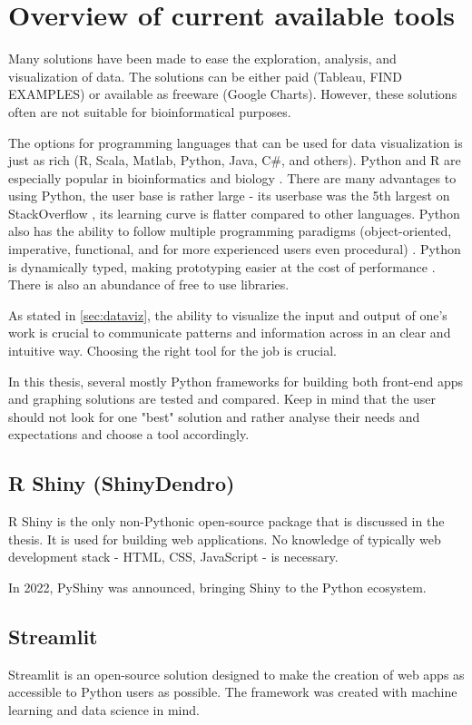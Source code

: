 \chapter{Overview of current available tools}
\label{chap:four}
Many solutions have been made to ease the exploration, analysis, and visualization of data. The solutions can be either paid (Tableau, FIND EXAMPLES) or available as freeware (Google Charts). However, these solutions often are not suitable for bioinformatical purposes. 

The options for programming languages that can be used for data visualization is just as rich (R, Scala, Matlab, Python, Java, C\#, and others). Python and R are especially popular in bioinformatics and biology \citep{giorgi2022r, gentleman2008r, bassi2016python}. There are many advantages to using Python, the user base is rather large - its userbase was the 5th largest on StackOverflow \citep{srinath2017python}, its learning curve is flatter compared to other languages. Python also has the ability to follow multiple programming paradigms (object-oriented, imperative, functional, and for more experienced users even procedural) \citep{srinath2017python, dyer2022exploratory}. Python is dynamically typed, making prototyping easier at the cost of performance \citep{tratt2009dynamically}. There is also an abundance of free to use libraries.

As stated in \ref{sec:dataviz}, the ability to visualize the input and output of one's work is crucial to communicate patterns and information across in an clear and intuitive way. Choosing the right tool for the job is crucial. 

In this thesis, several mostly Python frameworks for building both front-end apps and graphing solutions are tested and compared. Keep in mind that the user should not look for one "best" solution and rather analyse their needs and expectations and choose a tool accordingly. 

\section{R Shiny (ShinyDendro)}
\label{sec:streamlit}
R Shiny is the only non-Pythonic open-source package that is discussed in the thesis. It is used for building web applications. No knowledge of typically web development stack - HTML, CSS, JavaScript - is necessary. 

In 2022, PyShiny was announced, bringing Shiny to the Python ecosystem.

\section{Streamlit}
\label{sec:streamlit}
Streamlit is an open-source solution designed to make the creation of web apps as accessible to Python users as possible. The framework was created with machine learning and data science in mind. 
 
